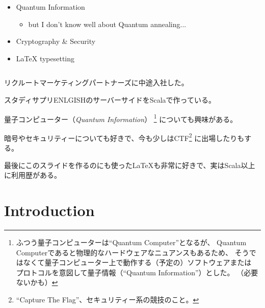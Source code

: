 \begin{frame}
\begin{columns}
\begin{column}{0.7\textwidth}
\begin{itemize}
        \item Quantum Information
        \begin{itemize}
          \item but I don't know well about Quantum annealing...
        \end{itemize}

        \item Cryptography \& Security
        
        \item {\LaTeX} typesetting
      \end{itemize}
    \end{column}
  \end{columns}

  \begin{notes}
    \item リクルートマーケティングパートナーズに中途入社した。
    \item スタディサプリENLGISHのサーバーサイドをScalaで作っている。
    \item 量子コンピューター（\emph{Quantum Information}）%
    \footnote{ふつう量子コンピューターは``Quantum Computer''となるが、%
      Quantum Computerであると物理的なハードウェアなニュアンスもあるため、
      そうではなくて量子コンピューター上で動作する（予定の）ソフトウェアまたは
      プロトコルを意図して量子情報（``Quantum Information''）とした。
      （必要ないかも）}
    についても興味がある。

    \item 暗号やセキュリティーについても好きで、今も少しはCTF\footnote{``Capture The Flag''、セキュリティー系の競技のこと。}%
    に出場したりもする。

    \item 最後にこのスライドを作るのにも使った{\LaTeX}も非常に好きで、実はScala以上に利用歴がある。
    
  \end{notes}
\end{frame}


\section{Introduction}

